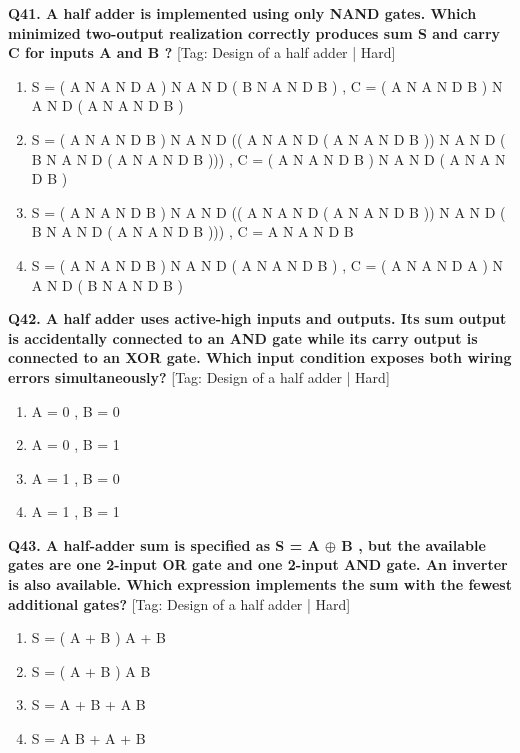 \noindent\textbf{Q41. A half adder is implemented using only NAND gates. Which minimized two-output realization correctly produces sum S and carry C for inputs A and B ?} \hfill [Tag: Design of a half adder | Hard]
\begin{enumerate}[label=(\alph*),topsep=2pt,itemsep=1pt,partopsep=0pt,parsep=0pt]
    \item {S = ( A N A N D A ) N A N D ( B N A N D B ) , C = ( A N A N D B ) N A N D ( A N A N D B )}
    \item {S = ( A N A N D B ) N A N D (( A N A N D ( A N A N D B )) N A N D ( B N A N D ( A N A N D B ))) , C = ( A N A N D B ) N A N D ( A N A N D B )}
    \item {S = ( A N A N D B ) N A N D (( A N A N D ( A N A N D B )) N A N D ( B N A N D ( A N A N D B ))) , C = A N A N D B}
    \item {S = ( A N A N D B ) N A N D ( A N A N D B ) , C = ( A N A N D A ) N A N D ( B N A N D B )}
\end{enumerate}
\vspace{2mm}

\noindent\textbf{Q42. A half adder uses active-high inputs and outputs. Its sum output is accidentally connected to an AND gate while its carry output is connected to an XOR gate. Which input condition exposes both wiring errors simultaneously?} \hfill [Tag: Design of a half adder | Hard]
\begin{enumerate}[label=(\alph*),topsep=2pt,itemsep=1pt,partopsep=0pt,parsep=0pt]
    \item {A = 0 , B = 0}
    \item {A = 0 , B = 1}
    \item {A = 1 , B = 0}
    \item {A = 1 , B = 1}
\end{enumerate}
\vspace{2mm}

\noindent\textbf{Q43. A half-adder sum is specified as S = A $\oplus$ B , but the available gates are one 2-input OR gate and one 2-input AND gate. An inverter is also available. Which expression implements the sum with the fewest additional gates?} \hfill [Tag: Design of a half adder | Hard]
\begin{enumerate}[label=(\alph*),topsep=2pt,itemsep=1pt,partopsep=0pt,parsep=0pt]
    \item {S = ( A + B ) A + B}
    \item {S = ( A + B ) A B}
    \item {S = A + B + A B}
    \item {S = A B + A + B}
\end{enumerate}
\vspace{2mm}

